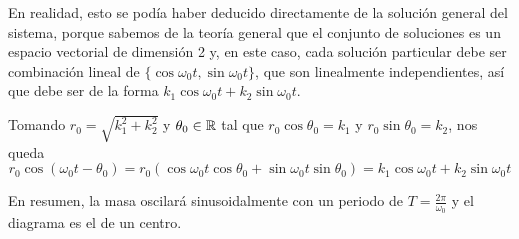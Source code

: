 \documentclass[../ecuaciones_diferenciales.tex]{subfiles}
\begin{document}
\begin{remark}
	En realidad, esto se podía haber deducido directamente de la solución general
	del sistema, porque sabemos de la teoría general que el conjunto de soluciones
	es un espacio vectorial de dimensión 2 y, en este caso, cada solución
	particular debe ser combinación lineal de
	\(\{\cos \omega_0 t, \sin \omega_0 t\}\), que son linealmente independientes,
	así que debe ser de la forma \(k_1 \cos \omega_0 t + k_2 \sin \omega_0 t\).
\end{remark}

Tomando \(r_0 = \sqrt{k_1^2+k_2^2}\) y \(\theta_0 \in \mathbb{R}\) tal que \(r_0 \cos
\theta_0 = k_1\) y \(r_0 \sin \theta_0 = k_2\), nos queda
\[r_0 \cos (\omega_0 t - \theta_0) = r_0(\cos \omega_0 t \cos \theta_0 + \sin
	\omega_0 t \sin \theta_0) = k_1 \cos \omega_0 t + k_2 \sin \omega_0 t\]

En resumen, la masa oscilará sinusoidalmente con un periodo de \(T =
\frac{2\pi}{\omega_0}\) y el diagrama es el de un centro.
\end{document}
